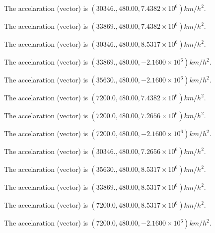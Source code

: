 \documentclass[12pt]{article}
\begin{document}
 
 
The accelaration (vector) is
$(
30346.,
480.00 ,
7.4382 \times 10^{6}
)km/h^2.
$
 
 
The accelaration (vector) is
$(
33869.,
480.00 ,
7.4382 \times 10^{6}
)km/h^2.
$
 
 
The accelaration (vector) is
$(
30346.,
480.00 ,
8.5317 \times 10^{6}
)km/h^2.
$
 
 
The accelaration (vector) is
$(
33869.,
480.00 ,
-2.1600 \times 10^{6}
)km/h^2.
$
 
 
The accelaration (vector) is
$(
35630.,
480.00 ,
-2.1600 \times 10^{6}
)km/h^2.
$
 
 
The accelaration (vector) is
$(
7200.0,
480.00 ,
7.4382 \times 10^{6}
)km/h^2.
$
 
 
The accelaration (vector) is
$(
7200.0,
480.00 ,
7.2656 \times 10^{6}
)km/h^2.
$
 
 
The accelaration (vector) is
$(
7200.0,
480.00 ,
-2.1600 \times 10^{6}
)km/h^2.
$
 
 
The accelaration (vector) is
$(
30346.,
480.00 ,
7.2656 \times 10^{6}
)km/h^2.
$
 
 
The accelaration (vector) is
$(
35630.,
480.00 ,
8.5317 \times 10^{6}
)km/h^2.
$
 
 
The accelaration (vector) is
$(
33869.,
480.00 ,
8.5317 \times 10^{6}
)km/h^2.
$
 
 
The accelaration (vector) is
$(
7200.0,
480.00 ,
8.5317 \times 10^{6}
)km/h^2.
$
 
 
\noindent{}
 
 
The accelaration (vector) is
$(
7200.0,
480.00 ,
-2.1600 \times 10^{6}
)km/h^2.
$
 
 
\noindent{}
 
 
 
 
 
 
\noindent{}
 
 
\end{document}
